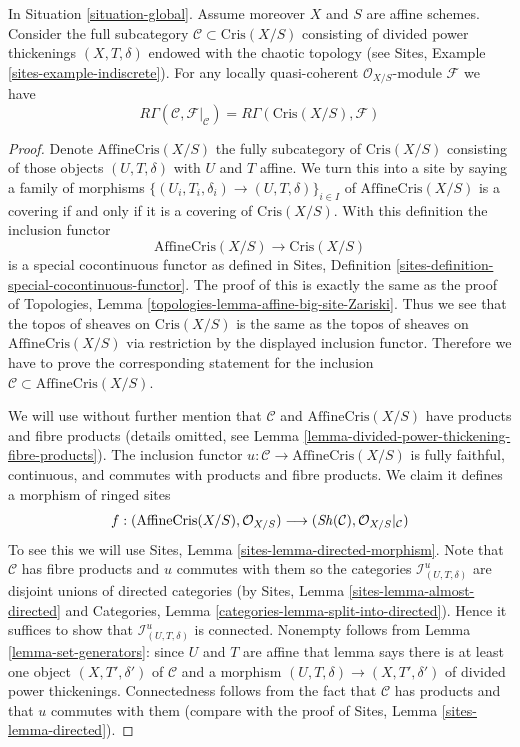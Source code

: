 \begin{lemma}
\label{lemma-compare}
In Situation \ref{situation-global}.
Assume moreover $X$ and $S$ are affine schemes.
Consider the full subcategory $\mathcal{C} \subset \text{Cris}(X/S)$
consisting of divided power thickenings $(X, T, \delta)$
endowed with the chaotic topology (see
Sites, Example \ref{sites-example-indiscrete}).
For any locally quasi-coherent $\mathcal{O}_{X/S}$-module $\mathcal{F}$
we have
$$
R\Gamma(\mathcal{C}, \mathcal{F}|_\mathcal{C}) =
R\Gamma(\text{Cris}(X/S), \mathcal{F})
$$
\end{lemma}

\begin{proof}
Denote $\text{AffineCris}(X/S)$ the fully subcategory of $\text{Cris}(X/S)$
consisting of those objects $(U, T, \delta)$ with $U$ and $T$ affine.
We turn this into a site by saying a family of morphisms
$\{(U_i, T_i, \delta_i) \to (U, T, \delta)\}_{i \in I}$ of
$\text{AffineCris}(X/S)$ is a covering if and only if it is a covering
of $\text{Cris}(X/S)$. With this definition the inclusion functor
$$
\text{AffineCris}(X/S) \longrightarrow \text{Cris}(X/S)
$$
is a special cocontinuous functor as defined in
Sites, Definition \ref{sites-definition-special-cocontinuous-functor}.
The proof of this is exactly the same as the proof of
Topologies, Lemma \ref{topologies-lemma-affine-big-site-Zariski}.
Thus we see that the topos of sheaves on $\text{Cris}(X/S)$
is the same as the topos of sheaves on $\text{AffineCris}(X/S)$
via restriction by the displayed inclusion functor.
Therefore we have to prove the corresponding statement for the
inclusion $\mathcal{C} \subset \text{AffineCris}(X/S)$.

\medskip\noindent
We will use without further mention that $\mathcal{C}$ and
$\text{AffineCris}(X/S)$ have products and fibre products
(details omitted, see
Lemma \ref{lemma-divided-power-thickening-fibre-products}).
The inclusion functor $u : \mathcal{C} \to \text{AffineCris}(X/S)$
is fully faithful, continuous, and commutes with products and fibre products.
We claim it defines a morphism of ringed sites
$$
f :
(\text{AffineCris}(X/S), \mathcal{O}_{X/S})
\longrightarrow
(\mathop{\mathit{Sh}}\nolimits(\mathcal{C}), \mathcal{O}_{X/S}|_\mathcal{C})
$$
To see this we will use Sites, Lemma \ref{sites-lemma-directed-morphism}.
Note that $\mathcal{C}$ has fibre products and $u$ commutes with them
so the categories $\mathcal{I}^u_{(U, T, \delta)}$ are disjoint unions
of directed categories (by Sites, Lemma \ref{sites-lemma-almost-directed} and
Categories, Lemma \ref{categories-lemma-split-into-directed}). Hence it
suffices to show that $\mathcal{I}^u_{(U, T, \delta)}$ is connected.
Nonempty follows from Lemma \ref{lemma-set-generators}: since $U$ and $T$
are affine that lemma says there is at least one object
$(X, T', \delta')$ of $\mathcal{C}$ and a morphism
$(U, T, \delta) \to (X, T', \delta')$ of divided power thickenings.
Connectedness follows from the fact that $\mathcal{C}$ has products
and that $u$ commutes with them (compare with the proof of
Sites, Lemma \ref{sites-lemma-directed}).


\end{proof}
